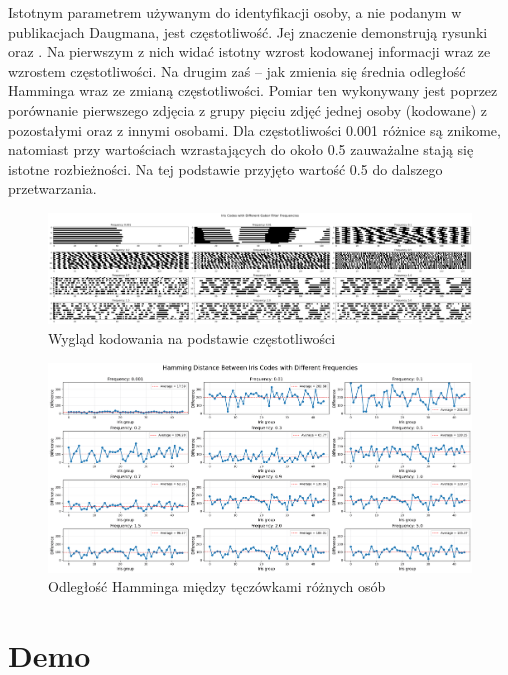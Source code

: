 \documentclass[a4paper]{article}
\begin{document}
Istotnym parametrem używanym do identyfikacji osoby, a nie podanym w publikacjach Daugmana, jest częstotliwość. Jej znaczenie demonstrują rysunki  oraz . Na pierwszym z nich widać istotny wzrost kodowanej informacji wraz ze wzrostem częstotliwości. Na drugim zaś – jak zmienia się średnia odległość Hamminga wraz ze zmianą częstotliwości. Pomiar ten wykonywany jest poprzez porównanie pierwszego zdjęcia z grupy pięciu zdjęć jednej osoby (kodowane) z pozostałymi oraz z innymi osobami. Dla częstotliwości 0.001 różnice są znikome, natomiast przy wartościach wzrastających do około 0.5 zauważalne stają się istotne rozbieżności. Na tej podstawie przyjęto wartość 0.5 do dalszego przetwarzania.

\begin{figure}[H]
    \centering
    \includegraphics[width=1\linewidth]{figures/waznosc_freq_1.png}
    \caption{Wygląd kodowania na podstawie częstotliwości}
    \label{fig:wpływ_freq_1}
\end{figure}

\begin{figure}[H]
    \centering
    \includegraphics[width=1\linewidth]{figures/waznosc_freq_2.png}
    \caption{Odległość Hamminga między tęczówkami różnych osób}
    \label{fig:wpływ_freq_2}
\end{figure}

\section{Demo}
\end{document}
